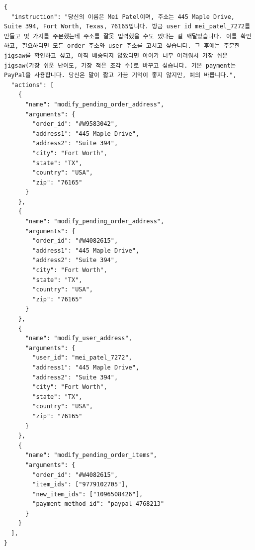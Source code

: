 \begin{verbatim}
{
  "instruction": "당신의 이름은 Mei Patel이며, 주소는 445 Maple Drive, Suite 394, Fort Worth, Texas, 76165입니다. 방금 user id mei_patel_7272를 만들고 몇 가지를 주문했는데 주소를 잘못 입력했을 수도 있다는 걸 깨달았습니다. 이를 확인하고, 필요하다면 모든 order 주소와 user 주소를 고치고 싶습니다. 그 후에는 주문한 jigsaw를 확인하고 싶고, 아직 배송되지 않았다면 아이가 너무 어려워서 가장 쉬운 jigsaw(가장 쉬운 난이도, 가장 적은 조각 수)로 바꾸고 싶습니다. 기본 payment는 PayPal을 사용합니다. 당신은 말이 짧고 가끔 기억이 좋지 않지만, 예의 바릅니다.",
  "actions": [
    {
      "name": "modify_pending_order_address",
      "arguments": {
        "order_id": "#W9583042",
        "address1": "445 Maple Drive",
        "address2": "Suite 394",
        "city": "Fort Worth",
        "state": "TX",
        "country": "USA",
        "zip": "76165"
      }
    },
    {
      "name": "modify_pending_order_address",
      "arguments": {
        "order_id": "#W4082615",
        "address1": "445 Maple Drive",
        "address2": "Suite 394",
        "city": "Fort Worth",
        "state": "TX",
        "country": "USA",
        "zip": "76165"
      }
    },
    {
      "name": "modify_user_address",
      "arguments": {
        "user_id": "mei_patel_7272",
        "address1": "445 Maple Drive",
        "address2": "Suite 394",
        "city": "Fort Worth",
        "state": "TX",
        "country": "USA",
        "zip": "76165"
      }
    },
    {
      "name": "modify_pending_order_items",
      "arguments": {
        "order_id": "#W4082615",
        "item_ids": ["9779102705"],
        "new_item_ids": ["1096508426"],
        "payment_method_id": "paypal_4768213"
      }
    }
  ],
}
\end{verbatim}


